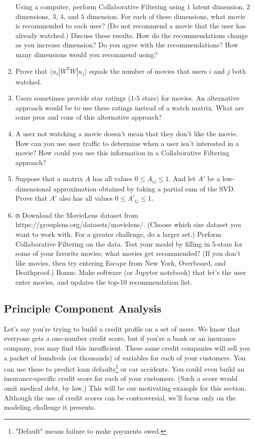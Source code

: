 \documentclass{amsbook}
\begin{document}
\begin{enumerate}
Using a computer, perform Collaborative Filtering using $1$ latent dimension, $2$ dimensions, $3$, $4$, and $5$ dimension.  For each of these dimensions, what movie is recommended to each user?  (Do not recommend a movie that the user has already watched.)  Discuss these results.  How do the recommendations change as you increase dimension?  Do you agree with the recommendations?  How many dimensions would you recommend using?
\item Prove that $\langle u_i|W^TW|u_j\rangle$ equals the number of movies that users $i$ and $j$ both watched.
\item Users sometimes provide star ratings ($1$-$5$ stars) for movies.  An alternative approach would be to use these ratings instead of a watch matrix.  What are some pros and cons of this alternative approach?
\item A user not watching a movie doesn't mean that they don't like the movie.  How can you use user traffic to determine when a user isn't interested in a movie?  How could you use this information in a Collaborative Filtering approach?
\item Suppose that a matrix $A$ has all values $0\leq A_{ij}\leq1$.  And let $A'$ be a low-dimensional approximation obtained by taking a partial sum of the SVD.  Prove that $A'$ also has all values $0\leq A'_{ij}\leq1$.
\item \label{movie_lens_1} $\obot$ Download the MovieLens dataset from https://grouplens.org/datasets/movielens/.  (Choose which size dataset you want to work with.  For a greater challenge, do a larger set.)  Perform Collaborative Filtering on the data.  Test your model by filling in 5-stars for some of your favorite movies; what movies get recommended?  (If you don’t like movies, then try entering Escape from New York, Overboard, and Deathproof.)  Bonus:  Make software (or Jupyter notebook) that let’s the user enter movies, and updates the top-10 recommendation list.
\end{enumerate}

\subsection{Principle Component Analysis}

Let's say you're trying to build a credit profile on a set of users.  We know that everyone gets a one-number credit score, but if you're a bank or an insurance company, you may find this insufficient.  These same credit companies will sell you a packet of hundreds (or thousands) of variables for each of your customers.  You can use these to predict loan defaults\footnote{"Default" means failure to make payments owed.} or car accidents.  You could even build an insurance-specific credit score for each of your customers.  (Such a score would omit medical debt, by law.)  This will be our motivating example for this section.  Although the use of credit scores can be controversial, we'll focus only on the modeling challenge it presents.
\end{document}
